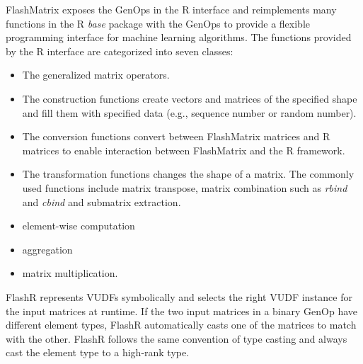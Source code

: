 FlashMatrix exposes the GenOps in the R interface and reimplements many functions
in the R \textit{base} package with the GenOps to provide a flexible programming
interface for machine learning algorithms. The functions provided by the R
interface are categorized into seven classes:
\begin{itemize}
	\item The generalized matrix operators.
	\item The construction functions create vectors and matrices of the specified
		shape and fill them with specified data (e.g., sequence number or random
		number).
	\item The conversion functions convert between FlashMatrix matrices and
		R matrices to enable interaction between FlashMatrix and the R framework.
	\item The transformation functions changes the shape of a matrix. The commonly
		used functions include matrix transpose, matrix combination such as
		\textit{rbind} and \textit{cbind} and submatrix extraction.
	\item element-wise computation
	\item aggregation
	\item matrix multiplication.
\end{itemize}

FlashR represents VUDFs symbolically and selects the right VUDF instance for
the input matrices at runtime. If the two input matrices in a binary GenOp have
different element types, FlashR automatically casts one of the matrices to
match with the other. FlashR follows the same convention of type casting and
always cast the element type to a high-rank type.




